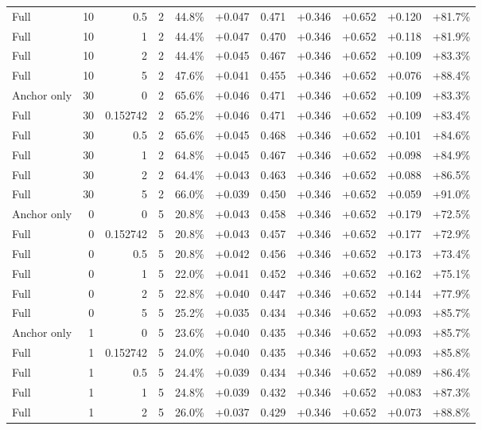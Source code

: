 \begin{table}[htbp]
\begin{tabular}{lrrrccccccc}
Full & 10 & 0.5 & 2 & 44.8\% & +0.047 & 0.471 & +0.346 & +0.652 & +0.120 & +81.7\% \\
Full & 10 & 1 & 2 & 44.4\% & +0.047 & 0.470 & +0.346 & +0.652 & +0.118 & +81.9\% \\
Full & 10 & 2 & 2 & 44.4\% & +0.045 & 0.467 & +0.346 & +0.652 & +0.109 & +83.3\% \\
Full & 10 & 5 & 2 & 47.6\% & +0.041 & 0.455 & +0.346 & +0.652 & +0.076 & +88.4\% \\
Anchor only & 30 & 0 & 2 & 65.6\% & +0.046 & 0.471 & +0.346 & +0.652 & +0.109 & +83.3\% \\
Full & 30 & 0.152742 & 2 & 65.2\% & +0.046 & 0.471 & +0.346 & +0.652 & +0.109 & +83.4\% \\
Full & 30 & 0.5 & 2 & 65.6\% & +0.045 & 0.468 & +0.346 & +0.652 & +0.101 & +84.6\% \\
Full & 30 & 1 & 2 & 64.8\% & +0.045 & 0.467 & +0.346 & +0.652 & +0.098 & +84.9\% \\
Full & 30 & 2 & 2 & 64.4\% & +0.043 & 0.463 & +0.346 & +0.652 & +0.088 & +86.5\% \\
Full & 30 & 5 & 2 & 66.0\% & +0.039 & 0.450 & +0.346 & +0.652 & +0.059 & +91.0\% \\
Anchor only & 0 & 0 & 5 & 20.8\% & +0.043 & 0.458 & +0.346 & +0.652 & +0.179 & +72.5\% \\
Full & 0 & 0.152742 & 5 & 20.8\% & +0.043 & 0.457 & +0.346 & +0.652 & +0.177 & +72.9\% \\
Full & 0 & 0.5 & 5 & 20.8\% & +0.042 & 0.456 & +0.346 & +0.652 & +0.173 & +73.4\% \\
Full & 0 & 1 & 5 & 22.0\% & +0.041 & 0.452 & +0.346 & +0.652 & +0.162 & +75.1\% \\
Full & 0 & 2 & 5 & 22.8\% & +0.040 & 0.447 & +0.346 & +0.652 & +0.144 & +77.9\% \\
Full & 0 & 5 & 5 & 25.2\% & +0.035 & 0.434 & +0.346 & +0.652 & +0.093 & +85.7\% \\
Anchor only & 1 & 0 & 5 & 23.6\% & +0.040 & 0.435 & +0.346 & +0.652 & +0.093 & +85.7\% \\
Full & 1 & 0.152742 & 5 & 24.0\% & +0.040 & 0.435 & +0.346 & +0.652 & +0.093 & +85.8\% \\
Full & 1 & 0.5 & 5 & 24.4\% & +0.039 & 0.434 & +0.346 & +0.652 & +0.089 & +86.4\% \\
Full & 1 & 1 & 5 & 24.8\% & +0.039 & 0.432 & +0.346 & +0.652 & +0.083 & +87.3\% \\
Full & 1 & 2 & 5 & 26.0\% & +0.037 & 0.429 & +0.346 & +0.652 & +0.073 & +88.8\% \\

\end{tabular}
\end{table}
